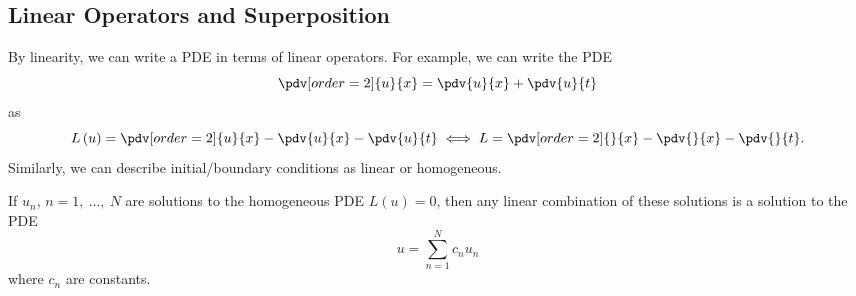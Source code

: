 \documentclass{article}
\begin{document}
\subsection{Linear Operators and Superposition}
By linearity, we can write a PDE in terms of linear operators. For example, we can write the PDE
\begin{equation*}
    \pdv[order=2]{u}{x} = \pdv{u}{x} + \pdv{u}{t}
\end{equation*}
as
\begin{equation*}
    L\left( u \right) = \pdv[order=2]{u}{x} - \pdv{u}{x} - \pdv{u}{t} \iff L = \pdv[order=2]{}{x} - \pdv{}{x} - \pdv{}{t}.
\end{equation*}
Similarly, we can describe initial/boundary conditions as linear or homogeneous.
\begin{theorem}[Superposition]
    If \(u_n\), \(n = 1,\: \dots,\: N\) are solutions to the homogeneous PDE \(L\left( u \right) = 0\), then any linear combination
    of these solutions is a solution to the PDE
    \begin{equation*}
        u = \sum_{n = 1}^N c_n u_n
    \end{equation*}
    where \(c_n\) are constants.
\end{theorem}
\end{document}
